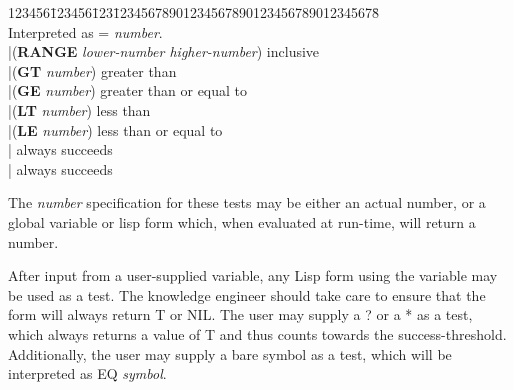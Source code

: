 \begin{tabbing}
123456\=123456\=123\=12345678901234567890123456789012345678\= \kill
{} \\
\>\> \>Interpreted as = {\it number\/}. \\
\>\>|\>({\bf RANGE} {\it lower-number higher-number\/}) \>inclusive \\
\>\>|\>({\bf GT} {\it number\/}) \>greater than \\
\>\>|\>({\bf GE} {\it number\/}) \>greater than or equal to \\
\>\>|\>({\bf LT} {\it number\/}) \>less than \\
\>\>|\>({\bf LE} {\it number\/}) \>less than or equal to \\
\>\>| \>always succeeds\\
\>\>|\>{\bf *} \>always succeeds
\\
\end{tabbing}

The {\it number} specification for these tests may be either an
actual number, or a global variable or lisp form which, when evaluated
at run-time, will return a number.

After input from a user-supplied variable, any Lisp form using the
variable may be used as a test.  The knowledge engineer should take care
to ensure that the form will always return T or NIL.  The user may
supply a ? or a * as a test, which always returns a value of T and thus
counts towards the success-threshold.  Additionally, the
user may supply a bare symbol as a test, which will be interpreted as
EQ {\it symbol\/}.


